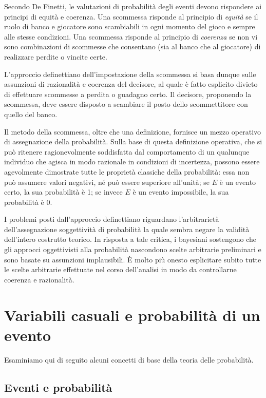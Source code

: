 \documentclass[
  11pt,
]{krantz}
\theoremstyle{definition}
\theoremstyle{definition}
\theoremstyle{definition}
\theoremstyle{definition}
\theoremstyle{remark}
\begin{document}
Secondo De Finetti, le valutazioni di probabilità degli eventi devono rispondere ai principi di equità e coerenza. Una scommessa risponde al principio di \emph{equità} se il ruolo di banco e giocatore sono scambiabili in ogni momento del gioco e sempre alle stesse condizioni. Una scommessa risponde al principio di \emph{coerenza} se non vi sono combinazioni di scommesse che consentano (sia al banco che al giocatore) di realizzare perdite o vincite certe.

L'approccio definettiano dell'impostazione della scommessa si basa dunque sulle assunzioni di razionalità e coerenza del decisore, al quale è fatto esplicito divieto di effettuare scommesse a perdita o guadagno certo. Il decisore, proponendo la scommessa, deve essere disposto a scambiare il posto dello scommettitore con quello del banco.

Il metodo della scommessa, oltre che una definizione, fornisce un mezzo operativo di assegnazione della probabilità. Sulla base di questa definizione operativa, che si può ritenere ragionevolmente soddisfatta dal comportamento di un qualunque individuo che agisca in modo razionale in condizioni di incertezza, possono essere agevolmente dimostrate tutte le proprietà classiche della probabilità: essa non può assumere valori negativi, né può essere superiore all'unità; se \(E\) è un evento certo, la sua probabilità è 1; se invece \(E\) è un evento impossibile, la sua probabilità è 0.

I problemi posti dall'approccio definettiano riguardano l'arbitrarietà dell'assegnazione soggettività di probabilità la quale sembra negare la validità dell'intero costrutto teorico. In risposta a tale critica, i bayesiani sostengono che gli approcci oggettivisti alla probabilità nascondono scelte arbitrarie preliminari e sono basate su assunzioni implausibili. È molto più onesto esplicitare subito tutte le scelte arbitrarie effettuate nel corso dell'analisi in modo da controllarne coerenza e razionalità.

\hypertarget{variabili-casuali-e-probabilituxe0-di-un-evento}{%
\section{Variabili casuali e probabilità di un evento}\label{variabili-casuali-e-probabilituxe0-di-un-evento}}

Esaminiamo qui di seguito alcuni concetti di base della teoria delle probabilità.

\hypertarget{eventi-e-probabilituxe0}{%
\subsection{Eventi e probabilità}\label{eventi-e-probabilituxe0}}
\end{document}
